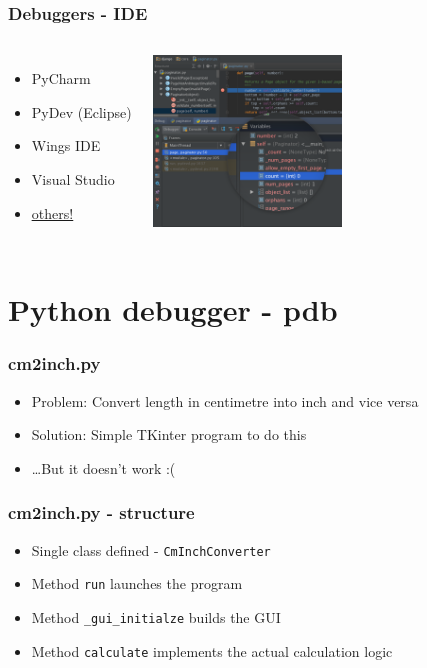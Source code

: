 \documentclass[14pt,notes,svgnames,aspectratio=169]{beamer}
\begin{document}
\begin{frame}
    \frametitle{Debuggers - IDE}
    \begin{columns}
        \begin{itemize}
            \item PyCharm
            \item PyDev (Eclipse)
            \item Wings IDE
            \item Visual Studio
            \item \color{blue}\href{https://wiki.python.org/moin/IntegratedDevelopmentEnvironments}{\uline{others!}}
        \end{itemize}

        \vspace*{0cm}
        \hspace*{0cm}\includegraphics[width=5cm]{"images/pycharm.png"}

    \end{columns}
\end{frame}

\begingroup
    \section{Python debugger - pdb}
\endgroup

\begin{frame}
    \frametitle{cm2inch.py}
    \begin{itemize}
        \item Problem: Convert length in centimetre into inch and vice versa
        \item Solution: Simple TKinter program to do this
        \pause
        \item …But it doesn't work :(
    \end{itemize}
\end{frame}

\begin{frame}
    \frametitle{cm2inch.py - structure}
    \begin{itemize}
        \item Single class defined - \lstinline{CmInchConverter}
        \item Method \lstinline{run} launches the program
        \item Method \lstinline{_gui_initialze} builds the GUI
        \item Method \lstinline{calculate} implements the actual calculation logic
    \end{itemize}
\end{frame}
\end{document}
